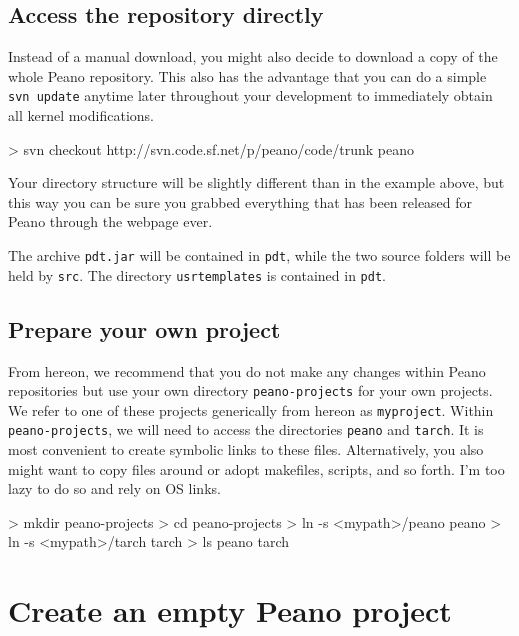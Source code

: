 \subsection{Access the repository directly}

Instead of a manual download, you might also decide to download a copy of the
whole Peano repository. 
This also has the advantage that you can do a simple \texttt{svn update} anytime
later throughout your development to immediately obtain all kernel
modifications.


\begin{code}
> svn checkout http://svn.code.sf.net/p/peano/code/trunk peano
\end{code}

\noindent
Your directory structure will be slightly different than in the example above,
but this way you can be sure you grabbed everything that has been released for
Peano through the webpage ever.

The archive \texttt{pdt.jar} will be contained in \texttt{pdt}, while the two
source folders will be held by \texttt{src}.
The directory \texttt{usrtemplates} is contained in \texttt{pdt}.


\subsection{Prepare your own project}


From hereon, we recommend that you do not make any changes within Peano
repositories but use your own directory \texttt{peano-projects} for your own
projects.
We refer to one of these projects generically from hereon as \texttt{myproject}.
Within \texttt{peano-projects}, we will need to access the directories
\texttt{peano} and \texttt{tarch}.
It is most convenient to create symbolic links to these files.
Alternatively, you also might want to copy files around or adopt makefiles,
scripts, and so forth.
I'm too lazy to do so and rely on OS links.


\begin{code}
> mkdir peano-projects
> cd peano-projects
> ln -s <mypath>/peano peano
> ln -s <mypath>/tarch tarch
> ls
  peano   tarch
\end{code}




\section{Create an empty Peano project}

